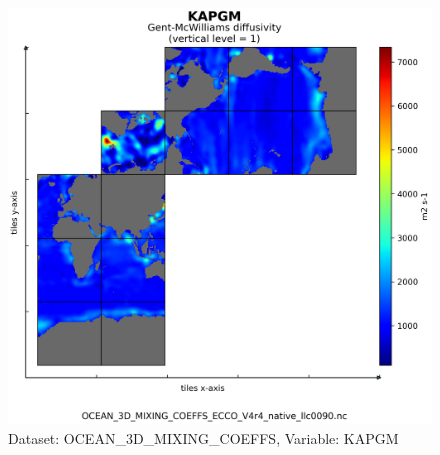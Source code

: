 \begin{figure}[H]
\centering
\includegraphics[scale=0.55]{../images/plots/native_plots/Ocean_3D_Gent-Mcwilliams_Redi_and_Background_Vertical_Diffusivity_Coefficients_for_the_Lat-Lon-Cap_90_(llc90)_Native_Model_Grid_(Version_4_Release_4)/KAPGM.png}
\caption{Dataset: OCEAN\_3D\_MIXING\_COEFFS, Variable: KAPGM}
\label{tab:table-OCEAN_3D_MIXING_COEFFS_KAPGM-Plot}
\end{figure}
\newpage
\pagebreak
